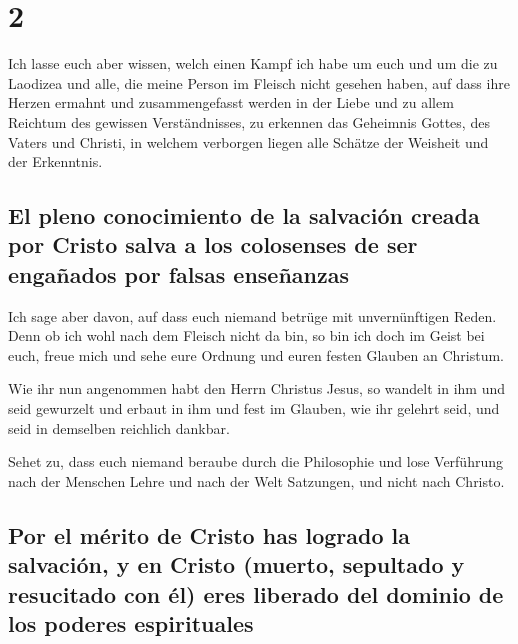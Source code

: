 \hypertarget{section-1}{%
\section{2}\label{section-1}}

 Ich lasse euch aber wissen, welch einen Kampf ich habe um
euch und um die zu Laodizea und alle, die meine Person im Fleisch nicht
gesehen haben,  auf dass ihre Herzen ermahnt und
zusammengefasst werden in der Liebe und zu allem Reichtum des gewissen
Verständnisses, zu erkennen das Geheimnis Gottes, des Vaters und
Christi,  in welchem verborgen liegen alle Schätze der
Weisheit und der Erkenntnis.

\hypertarget{el-pleno-conocimiento-de-la-salvaciuxf3n-creada-por-cristo-salva-a-los-colosenses-de-ser-engauxf1ados-por-falsas-enseuxf1anzas}{%
\subsection{El pleno conocimiento de la salvación creada por Cristo
salva a los colosenses de ser engañados por falsas
enseñanzas}\label{el-pleno-conocimiento-de-la-salvaciuxf3n-creada-por-cristo-salva-a-los-colosenses-de-ser-engauxf1ados-por-falsas-enseuxf1anzas}}

 Ich sage aber davon, auf dass euch niemand betrüge mit
unvernünftigen Reden.  Denn ob ich wohl nach dem Fleisch
nicht da bin, so bin ich doch im Geist bei euch, freue mich und sehe
eure Ordnung und euren festen Glauben an Christum.

 Wie ihr nun angenommen habt den Herrn Christus Jesus, so
wandelt in ihm  und seid gewurzelt und erbaut in ihm und
fest im Glauben, wie ihr gelehrt seid, und seid in demselben reichlich
dankbar.

 Sehet zu, dass euch niemand beraube durch die Philosophie
und lose Verführung nach der Menschen Lehre und nach der Welt Satzungen,
und nicht nach Christo.

\hypertarget{por-el-muxe9rito-de-cristo-has-logrado-la-salvaciuxf3n-y-en-cristo-muerto-sepultado-y-resucitado-con-uxe9l-eres-liberado-del-dominio-de-los-poderes-espirituales}{%
\subsection{Por el mérito de Cristo has logrado la salvación, y en
Cristo (muerto, sepultado y resucitado con él) eres liberado del dominio
de los poderes
espirituales}\label{por-el-muxe9rito-de-cristo-has-logrado-la-salvaciuxf3n-y-en-cristo-muerto-sepultado-y-resucitado-con-uxe9l-eres-liberado-del-dominio-de-los-poderes-espirituales}}

